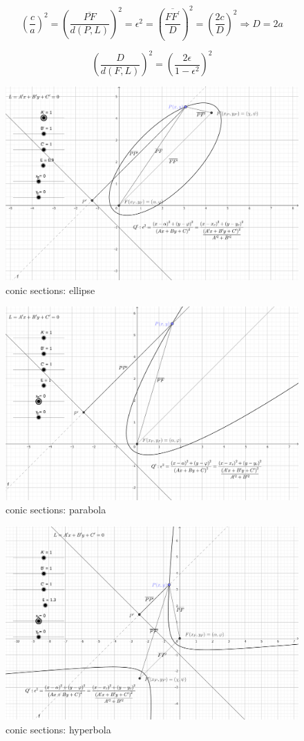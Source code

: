 \documentclass[
]{book}
\theoremstyle{definition}
\theoremstyle{definition}
\theoremstyle{definition}
\theoremstyle{definition}
\theoremstyle{remark}
\begin{document}
\[
\left(\dfrac{c}{a}\right)^{2}=\left(\dfrac{\overline{PF}}{d\left(P,L\right)}\right)^{2}=\epsilon^{2}=\left(\dfrac{\overline{FF^{\prime}}}{D}\right)^{2}=\left(\dfrac{2c}{D}\right)^{2}\Rightarrow D=2a
\]

\[
\left(\dfrac{D}{d\left(F,L\right)}\right)^{2}=\left(\dfrac{2\epsilon}{1-\epsilon^{2}}\right)^{2}
\]

\begin{figure}
\includegraphics[width=0.75\linewidth]{img/conic-sections-ellipse} \caption{conic sections: ellipse}\label{fig:unnamed-chunk-4}
\end{figure}

\begin{figure}
\includegraphics[width=0.75\linewidth]{img/conic-sections-parabola} \caption{conic sections: parabola}\label{fig:unnamed-chunk-5}
\end{figure}

\begin{figure}
\includegraphics[width=0.75\linewidth]{img/conic-sections-hyperbola} \caption{conic sections: hyperbola}\label{fig:unnamed-chunk-6}
\end{figure}
\end{document}
